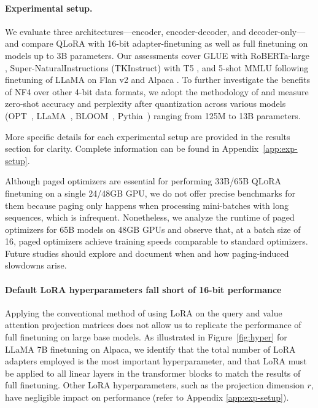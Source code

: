 \paragraph{Experimental setup.} We evaluate three architectures—encoder, encoder-decoder, and decoder-only—and compare QLoRA with 16-bit adapter-finetuning as well as full finetuning on models up to 3B parameters. Our assessments cover GLUE \citep{wang2018glue} with RoBERTa-large \citep{liu2019roberta}, Super-NaturalInstructions (TKInstruct) \citep{wang2022super} with T5 \citep{t5}, and 5-shot MMLU \citep{hendrycksmeasuring} following finetuning of LLaMA on Flan v2 \citep{longpre2023flan} and Alpaca \citep{alpaca}. To further investigate the benefits of NF4 over other 4-bit data formats, we adopt the methodology of \citet{dettmers2022case} and measure zero-shot accuracy and perplexity after quantization across various models (OPT~\citep{zhang2022opt}, LLaMA~\citep{touvron2023llama}, BLOOM~\citep{scao2022bloom}, Pythia~\citep{biderman2023pythia}) ranging from 125M to 13B parameters.

More specific details for each experimental setup are provided in the results section for clarity. Complete information can be found in Appendix~\ref{app:exp-setup}.

Although paged optimizers are essential for performing 33B/65B \textsc{QLoRA} finetuning on a single 24/48GB GPU, we do not offer precise benchmarks for them because paging only happens when processing mini-batches with long sequences, which is infrequent. Nonetheless, we analyze the runtime of paged optimizers for 65B models on 48GB GPUs and observe that, at a batch size of 16, paged optimizers achieve training speeds comparable to standard optimizers. Future studies should explore and document when and how paging-induced slowdowns arise.

\paragraph{Default LoRA hyperparameters fall short of 16-bit performance}

Applying the conventional method of using LoRA on the query and value attention projection matrices \citep{hu2021lora} does not allow us to replicate the performance of full finetuning on large base models. As illustrated in Figure~\ref{fig:hyper} for LLaMA 7B finetuning on Alpaca, we identify that the total number of LoRA adapters employed is the most important hyperparameter, and that LoRA must be applied to all linear layers in the transformer blocks to match the results of full finetuning. Other LoRA hyperparameters, such as the projection dimension $r$, have negligible impact on performance (refer to Appendix \ref{app:exp-setup}).

